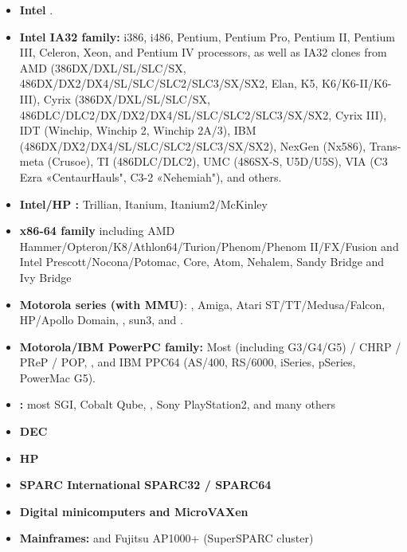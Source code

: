\begin{latin}
\begin{itemize}
	\item {\bfseries Intel }.
	\item {\bfseries Intel IA32 family:} i386, i486, Pentium, Pentium Pro,
		Pentium II, Pentium III, Celeron, Xeon, and Pentium IV processors,
		as well as IA32 clones from AMD (386DX/DXL/SL/SLC/SX,
		486DX/DX2/DX4/SL/SLC/SLC2/SLC3/SX/SX2, Elan, K5,
		K6/K6-II/K6-III), Cyrix (386DX/DXL/SL/SLC/SX,
		486DLC/DLC2/DX/DX2/DX4/SL/SLC/SLC2/SLC3/SX/SX2, Cyrix III),
		IDT (Winchip, Winchip 2, Winchip 2A/3),
		IBM (486DX/DX2/DX4/SL/SLC/SLC2/SLC3/SX/SX2),
		NexGen (Nx586), Transmeta (Crusoe),
		TI (486DLC/DLC2), UMC (486SX-S, U5D/U5S),
		VIA (C3 Ezra «CentaurHauls", C3-2 «Nehemiah"),
		and others.
	\item {\bfseries Intel/HP :} Trillian, Itanium, Itanium2/McKinley
	\item {\bfseries x86-64 family} including AMD Hammer/Opteron/K8/Athlon64/Turion/Phenom/Phenom II/FX/Fusion and
		Intel Prescott/Nocona/Potomac, Core, Atom, Nehalem, Sandy Bridge and Ivy Bridge
	\item {\bfseries Motorola  series (with MMU)}:
		,
		Amiga, Atari ST/TT/Medusa/Falcon, HP/Apollo Domain,
		, sun3, and
		.
	\item {\bfseries Motorola/IBM PowerPC family:} Most
		 (including G3/G4/G5)  / CHRP / PReP / POP, , and IBM PPC64 (AS/400, RS/6000, iSeries,	pSeries, PowerMac G5).
	\item {\bfseries {}:} most SGI, Cobalt Qube,
		, Sony PlayStation2, and many others
	\item {\bfseries DEC}
	\item {\bfseries HP }
	\item {\bfseries SPARC International SPARC32 / SPARC64}
	\item {\bfseries Digital  minicomputers and MicroVAXen}
	\item {\bfseries Mainframes:} 
		 and Fujitsu AP1000+ (SuperSPARC cluster)
\end{itemize}
\end{latin}

